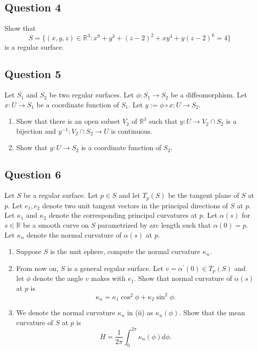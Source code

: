 \documentclass[12pt, a4paper]{article}
\newcommand{\R}{\mathbb{R}}
\begin{document}
\subsection*{Question 4}
Show that
\[ S=\{(x,y,z)\in\R^{3}:x^{9}+y^{3}+(z-2)^{2}+xy^{4}+y(z-2)^{6}=4\} \]
is a regular surface.
\newpage

\subsection*{Question 5}
Let $S_{1}$ and $S_{2}$ be two regular surfaces. Let $\phi:S_{1}\rightarrow S_{2}$ be a diffeomorphism. Let $x:U\rightarrow S_{1}$ be a coordinate function of $S_{1}$. Let $y:=\phi\circ x:U\rightarrow S_{2}$.
\begin{enumerate}[label=(\roman*)]
    \item Show that there is an open subset $V_{2}$ of $\R^{3}$ such that $y:U\rightarrow V_{2}\cap S_{2}$ is a bijection and $y^{-1}:V_{2}\cap S_{2}\rightarrow U$ is continuous.
    \item Show that $y:U\rightarrow S_{2}$ is a coordinate function of $S_{2}$.
\end{enumerate}
\newpage

\subsection*{Question 6}
Let $S$ be a regular surface. Let $p\in S$ and let $T_{p}(S)$ be the tangent plane of $S$ at $p$. Let $e_{1}, e_2$ denote two unit tangent vectors in the principal directions of $S$ at $p$. Let $\kappa_{1}$ and $\kappa_{2}$ denote the corresponding principal curvatures at $p$. Let $\alpha(s)$ for $s\in\R$ be a smooth curve on $S$ parametrized by arc length such that $\alpha(0)=p$. Let $\kappa_{n}$ denote the normal curvature of $\alpha(s)$ at $p$.
\begin{enumerate}[label=(\roman*)]
    \item Suppose $S$ is the unit sphere, compute the normal curvature $\kappa_{n}$.
    \item From now on, $S$ is a general regular surface. Let $v=\alpha^{\prime}(0)\in T_{p}(S)$ and let $\phi$ denote the angle $v$ makes with $e_1$. Show that normal curvature of $\alpha(s)$ at $p$ is
    \[ \kappa_{n}=\kappa_{1}\cos^{2}\phi+\kappa_{2}\sin^{2}\phi. \]
    \item We denote the normal curvature $\kappa_{n}$ in (ii) as $\kappa_{n}(\phi)$. Show that the mean curvature of $S$ at $p$ is
    \[ H=\frac{1}{2\pi}\int_{0}^{2\pi}\kappa_{n}(\phi)d\phi. \]
\end{enumerate}
\newpage
\end{document}
